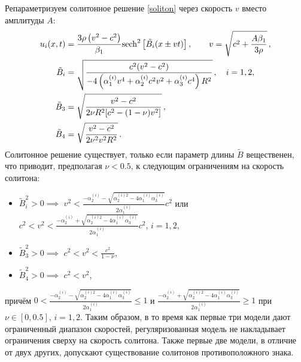 \documentclass[12pt, a4paper]{report}
\begin{document}
Репараметризуем солитонное решение \eqref{soliton} через скорость $v$ вместо амплитуды $A$:
\begin{align}
\label{soliton_v}
u_i(x, t) &= \frac{3 \rho \left(v^2 - c^2\right)}{\beta_1} {\rm sech}^{2}\left[\tilde{B_i}(x\pm v t)\right], \qquad v = \sqrt{c^2+\frac{A\beta_1}{3 \rho}} \, ,\\
\label{Bimod}
\tilde{B}_i &= \sqrt{\frac{c^2(v^2- c^2)}{-4\left(\alpha_1^{(i)} v^4 + \alpha_2^{(i)} c^2 v^2 + \alpha_3^{(i)}c^4\right)R^2}} \, , \quad i =1,2,\\
\label{B3mod}
\tilde{B}_3 &= \sqrt{\frac{v^2- c^2}{2\nu R^2 [c^2 - (1 - \nu) v^2 ]}} \, ,\\
\label{B4mod}
\tilde{B}_4 &= \sqrt{\frac{v^2- c^2}{2\nu^2 v^2 R^2}} \, .
\end{align}
Солитонное решение существует, только если параметр длины $\tilde{B}$ вещественен, что приводит, предполагая $\nu < 0.5$, к следующим ограничениям на скорость солитона:
\begin{itemize}
	\item $\tilde{B}_i^2 > 0 \implies$ $\displaystyle v^2 < \frac{-\alpha_2^{(i)} - \sqrt{\alpha_2^{(i)2} - 4\alpha_1^{(i)}\alpha_3^{(i)}}}{2\alpha_1^{(i)}} c^2$ или $\displaystyle c^2 < v^2 < \frac{-\alpha_2^{(i)} + \sqrt{\alpha_2^{(i)2} - 4\alpha_1^{(i)}\alpha_3^{(i)}}}{2\alpha_1^{(i)}} c^2$, $i=1,2$,
	\item $\tilde{B}_3^2 > 0 \implies$ $\displaystyle c^2 < v^2 < \frac{c^2}{1-\nu}$, 
	\item $\tilde{B}_4^2 > 0 \implies$ $c^2 < v^2$,
\end{itemize}
причём $\displaystyle 0 < \frac{-\alpha_2^{(i)} - \sqrt{\alpha_2^{(i)2} - 4\alpha_1^{(i)}\alpha_3^{(i)}}}{2\alpha_1^{(i)}} \leqslant 1$ и $\displaystyle \frac{-\alpha_2^{(i)} + \sqrt{\alpha_2^{(i)2} - 4\alpha_1^{(i)}\alpha_3^{(i)}}}{2\alpha_1^{(i)}} \geqslant 1$ при $\nu\in[0, 0.5]$, $i=1,2$. 
Таким образом, в то время как первые три модели дают ограниченный диапазон скоростей, регуляризованная модель не накладывает ограничения сверху на скорость солитона. Также первые две модели, в отличие от двух других, допускают существование солитонов противоположного знака. 
\end{document}
